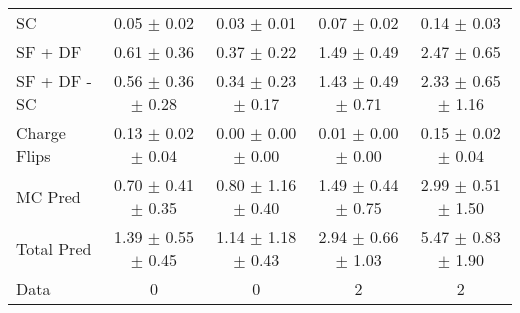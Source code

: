 \begin{tabular}{l|cccc}
                                 SC &  0.05 $\pm$  0.02 &  0.03 $\pm$  0.01 &  0.07 $\pm$  0.02 &  0.14 $\pm$  0.03 \\
                            SF + DF &  0.61 $\pm$  0.36 &  0.37 $\pm$  0.22 &  1.49 $\pm$  0.49 &  2.47 $\pm$  0.65 \\
\hline
                       SF + DF - SC &  0.56 $\pm$  0.36 $\pm$  0.28 &  0.34 $\pm$  0.23 $\pm$  0.17 &  1.43 $\pm$  0.49 $\pm$  0.71 &  2.33 $\pm$  0.65 $\pm$  1.16 \\
\hline\hline
                       Charge Flips &  0.13 $\pm$  0.02 $\pm$  0.04 &  0.00 $\pm$  0.00 $\pm$  0.00 &  0.01 $\pm$  0.00 $\pm$  0.00 &  0.15 $\pm$  0.02 $\pm$  0.04 \\
\hline
                            MC Pred &  0.70 $\pm$  0.41 $\pm$  0.35 &  0.80 $\pm$  1.16 $\pm$  0.40 &  1.49 $\pm$  0.44 $\pm$  0.75 &  2.99 $\pm$  0.51 $\pm$  1.50 \\
\hline
                         Total Pred &  1.39 $\pm$  0.55 $\pm$  0.45 &  1.14 $\pm$  1.18 $\pm$  0.43 &  2.94 $\pm$  0.66 $\pm$  1.03 &  5.47 $\pm$  0.83 $\pm$  1.90 \\
\hline\hline
                               Data &     0 &     0 &     2 &     2 \\
\hline\hline
\end{tabular}

